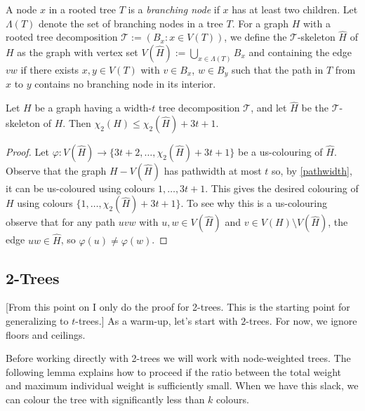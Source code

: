 \documentclass[kpfonts]{patmorin}
\newcommand{\uqs}{\chi_2}
\begin{document}
A node $x$ in a rooted tree $T$ is a \emph{branching node} if $x$ has at least two children.  Let $\Lambda(T)$ denote the set of branching nodes in a tree $T$. For a graph $H$ with a rooted tree decomposition $\mathcal{T}:=(B_x:x\in V(T))$, we define the $\mathcal{T}$-skeleton $\hat{H}$ of $H$ as the graph with vertex set $V(\hat{H}):=\bigcup_{x\in \Lambda(T)} B_x$ and containing the edge $vw$ if there exists $x,y\in V(T)$ with $v\in B_x$, $w\in B_y$ such that the path in $T$ from $x$ to $y$ contains no branching node in its interior.

\begin{lem}\label{skeleton-colour}
    Let $H$ be a graph having a width-$t$ tree decomposition $\mathcal{T}$, and let $\hat{H}$ be the $\mathcal{T}$-skeleton of $H$.  Then $\uqs(H)\le \uqs(\hat{H}) + 3t+1$.
\end{lem}

\begin{proof}
    Let $\varphi:V(\hat{H})\to \{3t+2,\ldots,\uqs(\hat{H})+3t+1\}$ be a us-colouring of $\hat{H}$.  Observe that the graph $H-V(\hat{H})$ has pathwidth at most $t$ so, by \cref{pathwidth}, it can be us-coloured using colours $1,\ldots,3t+1$.  This gives the desired colouring of $H$ using colours $\{1,\ldots,\uqs(\hat{H})+3t+1\}$.  To see why this is a us-colouring observe that for any path $uvw$ with $u,w\in V(\hat{H})$ and $v\in V(H)\setminus V(\hat{H})$, the edge $uw\in\hat{H}$, so $\varphi(u)\neq\varphi(w)$.
\end{proof}


\subsection{2-Trees}

[From this point on I only do the proof for 2-trees. This is the starting point for generalizing to $t$-trees.]
As a warm-up, let's start with $2$-trees.  For now, we ignore floors and ceilings.

Before working directly with 2-trees we will work with node-weighted trees. The following lemma explains how to proceed if the ratio between the total weight and maximum individual weight is sufficiently small.  When we have this slack, we can colour the tree with significantly less than $k$ colours.
\end{document}
